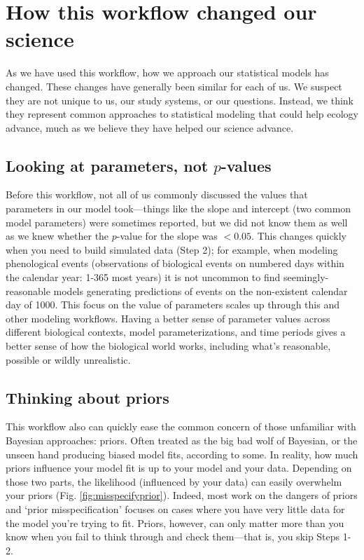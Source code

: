 \documentclass[11pt]{article}
\begin{document}
\section*{How this workflow changed our science} 

As we have used this workflow, how we approach our statistical models has changed. These changes have generally been similar for each of us. We suspect they are not unique to us, our study systems, or our questions. Instead, we think they represent common approaches to statistical modeling that could help ecology advance, much as we believe they have helped our science advance. 

 \subsection*{Looking at parameters, not $p$-values} 
Before this workflow, not all of us commonly discussed the values that parameters in our model took---things like the slope and intercept (two common model parameters) were sometimes reported, but we did not know them as well as we knew whether the $p$-value for the slope was $<0.05$. This changes quickly when you need to build simulated data (Step 2); for example, when modeling phenological events (observations of biological events on numbered days within the calendar year: 1-365 most years) it is not uncommon to find seemingly-reasonable models generating predictions of events on the non-existent calendar day of 1000. This focus on the value of parameters scales up through this and other modeling workflows. Having a better sense of parameter values across different biological contexts, model parameterizations, and time periods gives a better sense of how the biological world works, including what's reasonable, possible or wildly unrealistic. %

 \subsection*{Thinking about priors} 
This workflow also can quickly ease the common concern of those unfamiliar with Bayesian approaches: priors. Often treated as the big bad wolf of Bayesian, or the unseen hand producing biased model fits, according to some. In reality, how much priors influence your model fit is up to your model and your data. Depending on those two parts, the likelihood (influenced by your data) can easily overwhelm your priors (Fig. \ref{fig:misspecifyprior}). Indeed, most work on the dangers of priors and `prior misspecification'  focuses on cases where you have very little data for the model you're trying to fit. Priors, however, can only matter more than you know when you fail to think through and check them---that is, you skip Steps 1-2. 
\end{document}
